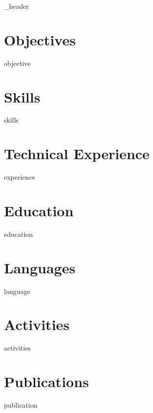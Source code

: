 \documentclass[letter,10pt]{article}
\author{Quang Nguyen} %
\begin{document}
{_header}
\section{Objectives}
{objective}

\section{Skills}
{skills}

\section{Technical Experience}
{experience}

\section{Education}
{education}

\section{Languages}
{language}

\section{Activities}
{activities}

\section{Publications}
{publication}
\end{document}
